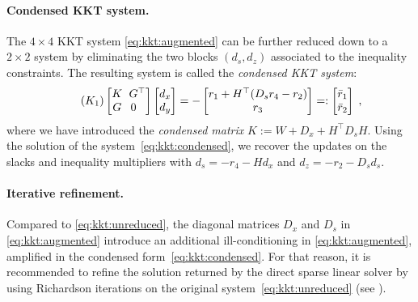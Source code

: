\paragraph{Condensed KKT system.}
The $4 \times 4$ KKT system \eqref{eq:kkt:augmented} can be further
reduced down to a $2 \times 2$ system by eliminating the two blocks
$(d_s, d_z)$ associated to the inequality constraints.
The resulting system is called the \emph{condensed KKT system}:
\begin{equation}
  \label{eq:kkt:condensed}
  \tag{$K_1$}
  \setlength\arraycolsep{3pt}
  \begin{bmatrix}
    K & G^\top \\
    G & 0\phantom{^\top}
  \end{bmatrix}
  \begin{bmatrix}
    d_x \\ d_y
  \end{bmatrix}
  =
  -
  \begin{bmatrix}
    r_1 + H^\top(D_s r_4 - r_2) \\ r_3
  \end{bmatrix}
  =:
  \begin{bmatrix}
    \bar{r}_1 \\ \bar{r}_2
  \end{bmatrix}
   \; ,
\end{equation}
where we have introduced the \emph{condensed matrix} $K := W + D_x + H^\top D_s H$.
Using the solution of the system~\eqref{eq:kkt:condensed},
we recover the updates on the slacks and inequality multipliers with
$d_s = -r_4 - Hd_x$ and $d_z = -r_2 - D_s d_s$.


\paragraph{Iterative refinement.}

Compared to \eqref{eq:kkt:unreduced},
the diagonal matrices $D_x$ and $D_s$ in \eqref{eq:kkt:augmented} introduce
an additional ill-conditioning in \eqref{eq:kkt:augmented}, amplified
in the condensed form~\eqref{eq:kkt:condensed}. For that reason, it
is recommended to refine the solution returned by the direct sparse linear
solver by using Richardson iterations on the original system~\eqref{eq:kkt:unreduced}
(see \cite[Section 3.10]{wachter2006implementation}).

